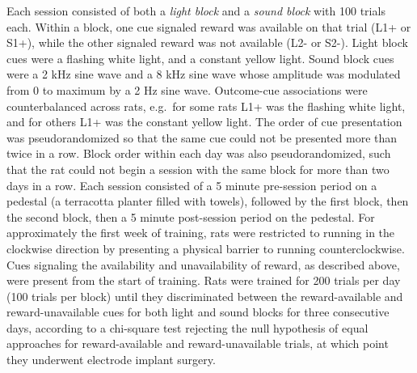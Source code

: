 \documentclass[11pt]{article}
\begin{document}
Each session consisted of both a {\it light block} and a {\it sound block} with
100 trials each. Within a block, one cue signaled reward was available on that
trial (L1+ or S1+), while the other signaled reward was not available (L2- or
S2-). Light block cues were a flashing white light, and a constant yellow
light. Sound block cues were a 2 kHz sine wave and a 8 kHz sine wave whose
amplitude was modulated from 0 to maximum by a 2 Hz sine wave. Outcome-cue
associations were counterbalanced across rats, e.g.\ for some rats L1+ was the
flashing white light, and for others L1+ was the constant yellow light. The
order of cue presentation was pseudorandomized so that the same cue could not be
presented more than twice in a row. Block order within each day was also
pseudorandomized, such that the rat could not begin a session with the same
block for more than two days in a row. Each session consisted of a 5 minute
pre-session period on a pedestal (a terracotta planter filled with towels),
followed by the first block, then the second block, then a 5 minute post-session
period on the pedestal. For approximately the first week of training, rats were restricted to
running in the clockwise direction by presenting a physical barrier to
running counterclockwise. Cues signaling the availability and
unavailability of reward, as described above, were present from the
start of training. Rats were trained for 200 trials per day (100
trials per block) until they discriminated between the reward-available and reward-unavailable cues for both light and
sound blocks for three consecutive days, according to a chi-square test
rejecting the null hypothesis of equal approaches for reward-available and
reward-unavailable trials, at which point they underwent electrode implant
surgery.
\end{document}
